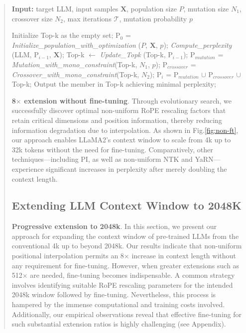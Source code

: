 \begin{abstract}
\begin{algorithm}[t]
	\small
	\caption{The search algorithm}
	\textbf{Input:} target LLM, input samples $\mathbf{X}$, population size $P$, mutation size $N_1$, crossover size $N_2$, max iterations $\mathcal{T}$, mutation probability $p$\\

	\begin{algorithmic}[1]
		\label{alg:search}
		\STATE Initialize Top-k as the empty set;
		\STATE $\text{P}_0$ = \textit{Initialize\_population\_with\_optimization} ($P$, $\mathbf{X}$, $p$);
		\STATE \textit{Compute\_perplexity} (LLM, $\text{P}_{i-1}$, $\mathbf{X}$);
		\STATE Top-k $\leftarrow$ \textit{Update\_Topk} (Top-k, $\text{P}_{i-1}$);
		\STATE $\text{P}_{mutation}$ = \textit{Mutation\_with\_mono\_constraint}(Top-k, $N_1$, $p$);
		\STATE $\text{P}_{crossover}$ = \textit{Crossover\_with\_mono\_constraint}(Top-k, $N_2$);
		\STATE $\text{P}_i$ = $\text{P}_{mutation}$ $\cup$ $\text{P}_{crossover}$ $\cup$ Top-k;
		\ENDFOR
		\STATE Output the member in Top-k achieving minimal perplexity;
	\end{algorithmic}
\end{algorithm}

\textbf{8$\times$ extension without fine-tuning}. Through evolutionary search, we successfully discover optimal non-uniform RoPE rescaling factors that retain critical dimensions and position information, thereby reducing information degradation due to interpolation. As shown in Fig.\ref{fig:non-ft}, our approach enables LLaMA2's context window to scale from 4k up to 32k tokens without the need for fine-tuning. Comparatively, other techniques—including PI, as well as non-uniform NTK and YaRN—experience significant increases in perplexity after merely doubling the context length.

\subsection{Extending LLM Context Window to 2048K}
\label{sec:extendto2048k}

\textbf{Progressive extension to 2048k}. In this section, we present our approach for expanding the context window of pre-trained LLMs from the conventional 4k up to beyond 2048k. Our results indicate that non-uniform positional interpolation permits an 8$\times$ increase in context length without any requirement for fine-tuning. However, when greater extensions such as 512$\times$ are needed, fine-tuning becomes indispensable. A common strategy involves identifying suitable RoPE rescaling parameters for the intended 2048k window followed by fine-tuning. Nevertheless, this process is hampered by the immense computational and training costs involved. Additionally, our empirical observations reveal that effective fine-tuning for such substantial extension ratios is highly challenging (see Appendix).


\end{abstract}
